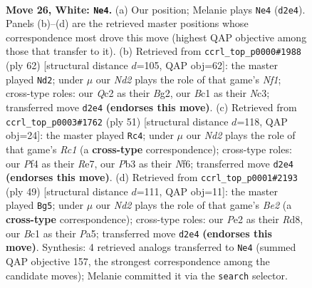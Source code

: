 \documentclass[11pt]{article}
\begin{document}
\clearpage

\begin{figure}[p]\centering
\begin{subfigure}{0.46\textwidth}\centering
\resizebox{\linewidth}{!}{%
\newchessgame
\chessboard[
  setfen={r1b2rk1/p2nb2p/2p5/3q4/Pp1p1P2/1P6/2QNPK2/RNBR4 w - - 3 26},
  showmover=false,
  pgfstyle=straightmove, color=movearrow, markmove={d2-e4}
]}
\caption{}
\end{subfigure}\hfill
\begin{subfigure}{0.46\textwidth}\centering
\resizebox{\linewidth}{!}{%
\newchessgame
\chessboard[
  setfen={5k2/1bnqr1bp/1pp2pp1/8/1PQP1P1P/2N3P1/6BK/3R1N2 w - - 6 32},
  showmover=false,
  pgfstyle=straightmove, color=movearrow, markmove={f1-d2}
]}
\caption{}
\end{subfigure}
\\[4pt]
\begin{subfigure}{0.46\textwidth}\centering
\resizebox{\linewidth}{!}{%
\newchessgame
\chessboard[
  setfen={2r3k1/4rpp1/1p1p1n2/3Pnq1p/1P1B3P/6P1/R4PB1/3Q1RK1 b - - 0 26},
  showmover=false,
  pgfstyle=straightmove, color=movearrow, markmove={c8-c4}
]}
\caption{}
\end{subfigure}\hfill
\begin{subfigure}{0.46\textwidth}\centering
\resizebox{\linewidth}{!}{%
\newchessgame
\chessboard[
  setfen={rn1r2k1/4bpp1/2P5/pB1n4/P2B3p/1N1Q4/1P3KPq/2R3R1 b - - 1 25},
  showmover=false,
  pgfstyle=straightmove, color=movearrow, markmove={e7-g5}
]}
\caption{}
\end{subfigure}
\caption{\textbf{Move 26, White: \texttt{Ne4}.} (a) Our position; Melanie plays \texttt{Ne4} (\texttt{d2e4}). Panels (b)--(d) are the retrieved master positions whose correspondence most drove this move (highest QAP objective among those that transfer to it). (b) Retrieved from \texttt{ccrl\_top\_p0000\#1988} (ply 62) [structural distance $d$=105, QAP obj=62]: the master played \texttt{Nd2}; under $\mu$ our \emph{Nd2} plays the role of that game's \emph{Nf1}; cross-type roles: our \emph{Q}c2 as their \emph{B}g2, our \emph{B}c1 as their \emph{N}c3; transferred move \texttt{d2e4} \textbf{(endorses this move)}. (c) Retrieved from \texttt{ccrl\_top\_p0003\#1762} (ply 51) [structural distance $d$=118, QAP obj=24]: the master played \texttt{Rc4}; under $\mu$ our \emph{Nd2} plays the role of that game's \emph{Rc1} (a \textbf{cross-type} correspondence); cross-type roles: our \emph{P}f4 as their \emph{R}e7, our \emph{P}b3 as their \emph{N}f6; transferred move \texttt{d2e4} \textbf{(endorses this move)}. (d) Retrieved from \texttt{ccrl\_top\_p0001\#2193} (ply 49) [structural distance $d$=111, QAP obj=11]: the master played \texttt{Bg5}; under $\mu$ our \emph{Nd2} plays the role of that game's \emph{Be2} (a \textbf{cross-type} correspondence); cross-type roles: our \emph{P}e2 as their \emph{R}d8, our \emph{B}c1 as their \emph{P}a5; transferred move \texttt{d2e4} \textbf{(endorses this move)}. Synthesis: 4 retrieved analogs transferred to \texttt{Ne4} (summed QAP objective 157, the strongest correspondence among the candidate moves); Melanie committed it via the \texttt{search} selector.}
\label{fig:thought-m50}
\end{figure}
\end{document}
